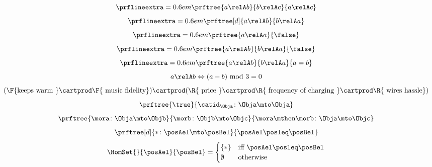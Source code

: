{\begin{forslides}
\begin{equation*}
		\end{equation*}
		\begin{equation*}
			\label{eq:rel_tran}
			\prflineextra=0.6em
			\prftree{a\relA b}{b\relA c}{a\relA c}
		\end{equation*}
		\begin{equation*}
			\label{eq:rel_sym}
			\prflineextra=0.6em
			\prftree[d]{a \relA b}{b\relA a}
		\end{equation*}
		\begin{equation*}
			\label{eq:rel_irr}
			\prflineextra=0.6em
			\prftree{a \relA a}{\false}
		\end{equation*}
		\begin{equation*}
			\label{eq:rel_asy}
			\prflineextra=0.6em
			\prftree{a \relA b}{b\relA a}{\false}
		\end{equation*}
		\begin{equation*}
			\label{eq:rel_antisy}
			\prflineextra=0.6em
			\prftree{a \relA b}{b\relA a}{a=b}
		\end{equation*}
		\begin{equation*}
			\label{eq:ex}
			a\relA b \Leftrightarrow (a-b) \text{ mod }3=0
		\end{equation*}
		\begin{equation*}
			\label{eq:fun_cost}
			(\F{\text{keeps warm }}\cartprod \F{\text{ music fidelity}})\cartprod(\R{\text{ price }} \cartprod \R{\text{ frequency of charging }}\cartprod \R{\text{ wires hassle}})
		\end{equation*}
		\begin{equation*}
			\label{eq:id_ex}
			\prftree{\true}{\catid_\Obja\colon \Obja \mto \Obja}
		\end{equation*}
		\begin{equation*}
			\label{eq:comp_cat}
			\prftree{\mora \colon \Obja \mto \Objb}{\morb\colon \Objb \mto \Objc}{\mora\mthen \morb \colon \Obja \mto \Objc}
		\end{equation*}
		\begin{equation*}
			\label{eq:mor_pre}
			\prftree[d]{\ast\colon \posAel \mto \posBel}{\posAel \posleq \posBel}
		\end{equation*}
		\begin{equation*}
			\label{eq:hom_pre}
			\HomSet{}{\posAel}{\posBel}=\begin{cases}
				\{\ast\}  & \text{iff } \posAel \posleq \posBel \\
				\emptyset & \text{otherwise}
			\end{cases}
		\end{equation*}

\end{forslides}}
